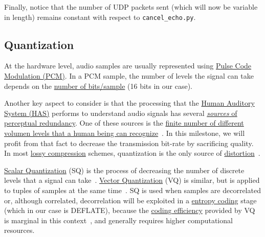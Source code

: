 Finally, notice that the number of UDP packets sent (which will now be
variable in length) remains constant with respect to
\verb|cancel_echo.py|.

\subsection{Quantization}
At the hardware level, audio samples are usually represented
using \href{https://en.wikipedia.org/wiki/Pulse-code_modulation}{Pulse
  Code Modulation (PCM)}. In a PCM sample, the number of levels
the signal can take depends on the
\href{https://en.wikipedia.org/wiki/Audio_bit_depth}{number of
  bits/sample} (16 bits in our case).

Another key aspect to consider is that the processing that the
\href{https://en.wikipedia.org/wiki/Auditory_system}{Human
  Auditory System (HAS)} performs to understand audio signals has several
\href{https://en.wikipedia.org/wiki/Psychoacoustics}{\emph{sources} of
  perceptual redundancy}. One of these sources is the
\href{https://en.wikipedia.org/wiki/Equal-loudness_contour}{finite
  number of different volumen levels that a human being can
  recognize}~\cite{bosi2003intro}. In this milestone, we will profit from
that fact to decrease the transmission bit-rate by sacrificing
quality. In most
\href{https://en.wikipedia.org/wiki/Lossy_compression}{lossy
  compression} schemes, quantization is the only source of
\href{https://en.wikipedia.org/wiki/Distortion}{distortion}~\cite{taubman2002jpeg2000}.

\href{https://en.wikipedia.org/wiki/Quantization_(signal_processing)}{Scalar
  Quantization} (SQ) is the process of decreasing the number of
discrete levels that a signal can
take~\cite{sayood2017introduction}. \href{https://en.wikipedia.org/wiki/Vector_quantization}{Vector
  Quantization} (VQ) is similar, but is applied to tuples of samples
at the same time~\cite{vetterli2014foundations}. SQ is used when
samples are decorrelated or, although correlated,
decorrelation will be exploited in a
\href{https://en.wikipedia.org/wiki/Entropy_encoding}{entropy coding}
stage (which in our case is DEFLATE), because the
\href{https://en.wikipedia.org/wiki/Quantization_(signal_processing)#Rate%E2%80%93distortion_optimization}{coding
  efficiency} provided by VQ is marginal in this
context~\cite{vetterli2014foundations}, and generally requires higher
computational resources.

